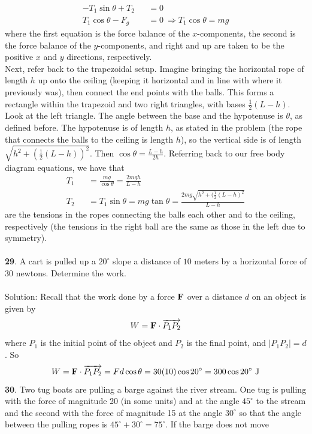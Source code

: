\documentclass[12pt]{amsbook}
\begin{document}
\begin{eqnarray*}
-T_1\sin\theta+T_2&&=0\\
T_1\cos\theta-F_g&&=0 \ \Rightarrow T_1\cos\theta=mg
\end{eqnarray*}
where the first equation is the force balance of the $x$-components, the second is the force balance of the $y$-components, and right and up are taken to be the positive $x$ and $y$ directions, respectively. 
\\
Next, refer back to the trapezoidal setup. Imagine bringing the horizontal rope of length $h$ up onto the ceiling (keeping it horizontal and in line with where it previously was), then connect the end points with the balls. This forms a rectangle within the trapezoid and two right triangles, with bases $\frac 12(L-h)$. Look at the left triangle. The angle between the base and the hypotenuse is $\theta$, as defined before. The hypotenuse is of length $h$, as stated in the problem (the rope that connects the balls to the ceiling is length $h$), so the vertical side is of length $\sqrt{h^2+(\frac 12(L-h))^2}$. Then $\cos\theta=\frac{L-h}{2h}$. Referring back to our free body diagram equations, we have that 
\begin{eqnarray*}
T_1&&=\frac{mg}{\cos\theta}=\frac{2mgh}{L-h}\\
T_2&&=T_1\sin\theta=mg\tan\theta=\frac{2mg\sqrt{h^2+(\frac 12(L-h)^2}}{L-h}
\end{eqnarray*}
are the tensions in the ropes connecting the balls each other and to the ceiling, respectively (the tensions in the right ball are the same as those in the left due to symmetry).
\\
\\
{\small\bf 29}. A cart is pulled up a $20^\circ$ slope a distance 
of $10$ meters by a horizontal force of $30$ newtons. Determine
the work.\\
\\
{\sc Solution}:
Recall that the work done by a force $\bf F$ over a distance $d$ on an object is given by
$$W={\bf F}\cdot\overrightarrow{P_1P_2}$$
where $P_1$ is the initial point of the object and $P_2$ is the final point, and $|P_1P_2|=d$. So
$$W={\bf F}\cdot\overrightarrow{P_1P_2}=Fd\cos\theta=30(10)\cos20^\circ =300\cos20^\circ \ \text{J}$$
{\small\bf 30}. Two tug boats are pulling a barge against the river stream. 
One tug is pulling with the force of magnitude 20 (in some units)
and at the angle $45^\circ$ to the stream and the second with the force 
of magnitude 15 at the angle $30^\circ$  so that the angle between
the pulling ropes is $45^\circ+30^\circ=75^\circ$. If the barge does not move
\end{document}
